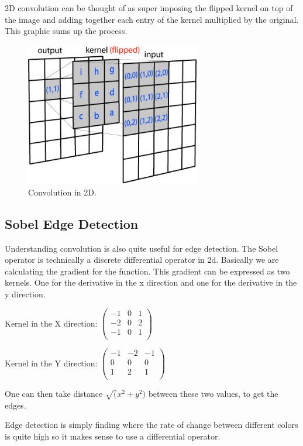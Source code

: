 \documentclass[11pt]{article}
\begin{document}
2D convolution can be thought of as super imposing the flipped kernel on top of the image and adding together each entry of the kernel multiplied by the original.
This graphic sums up the process.
\begin{figure}[htp]
\centering
\includegraphics[width=3in]{conv2d_matrix.jpg}
\caption{Convolution in 2D.}
\label{}
\end{figure}

\subsection{Sobel Edge Detection}
Understanding convolution is also quite useful for edge detection. The Sobel operator is technically a discrete differential operator in 2d. Basically we are calculating the gradient for the function. This gradient can be expressed as two kernels. One for the derivative in the x direction and one for the derivative in the y direction. 

Kernel in the X direction:
$\begin{pmatrix}
	-1 & 0 & 1\\
	-2 & 0 & 2\\
	-1 & 0 & 1\\
\end{pmatrix}$

Kernel in the Y direction:
$\begin{pmatrix}
	-1 & -2 & -1\\
	0 & 0 & 0\\
	1 & 2 & 1\\
\end{pmatrix}$
 
One can then take distance $\sqrt(x^2+y^2)$ between these two values, to get the edges. 

Edge detection is simply finding where the rate of change between different colors is quite high so it makes sense to use a differential operator. 
\end{document}
